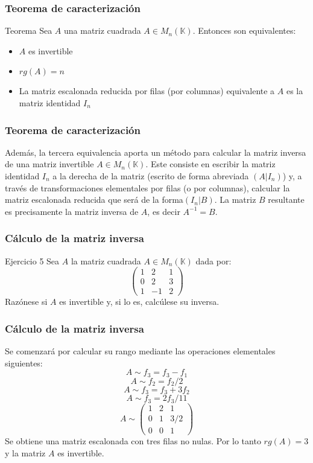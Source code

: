 \documentclass[aspectratio=169]{beamer}
\begin{document}
    
     \begin{frame}
  \frametitle{Teorema de caracterizaci\'on}
   \begin{block}{Teorema}
Sea $A$ una matriz cuadrada $A\in M_n(\mathbb{K})$. Entonces son equivalentes:
\begin{itemize}
\item $A$ es invertible
\item $rg(A) = n$
\item La matriz escalonada reducida por filas (por columnas) equivalente a $A$ es la matriz identidad $I_n$
\end{itemize}
\end{block}
  \end{frame} 
  
       \begin{frame}
  \frametitle{Teorema de caracterizaci\'on}
Adem\'as, la tercera equivalencia aporta un m\'etodo para calcular la matriz inversa de una matriz invertible $A \in M_n(\mathbb{K})$. Este consiste en escribir la matriz identidad $I_n$ a la derecha de la matriz (escrito de forma abreviada $(A | I_n)$) y, a trav\'es de transformaciones elementales por filas (o por columnas), calcular la matriz escalonada reducida que ser\'a de la forma$(I_n | B)$. La matriz $B$ resultante es precisamente la matriz inversa de $A$, es decir $A^{-1} = B$.
    \end{frame} 


     \begin{frame}
  \frametitle{C\'alculo de la matriz inversa}
   \begin{block}{Ejercicio 5}
Sea $A$ la matriz cuadrada $A\in M_n(\mathbb{K})$ dada por:
\[ \left(\begin{array}{ccc}1 & 2 & 1 \\0 & 2 & 3 \\1 & -1 & 2\end{array}\right)\]
Raz\'onese si $A$ es invertible y, si lo es, calc\'ulese su inversa.
\end{block}
  \end{frame} 
  
    \begin{frame}
  \frametitle{C\'alculo de la matriz inversa}
Se comenzar\'a por calcular su rango mediante las operaciones elementales siguientes:
\[A\sim f_3 = f_3-f_1\]
\[A\sim f_2 = f_2/2\]
\[A\sim f_3 = f_3+3f_2\]
\[A\sim f_3 = 2f_3/11\]
\[A\sim \left(\begin{array}{ccc}1 & 2 & 1 \\0 & 1 & 3/2 \\0 & 0 & 1\end{array}\right)\]
Se obtiene una matriz escalonada con tres filas no nulas. Por lo tanto $rg(A)=3$ y la matriz $A$ es invertible.
  \end{frame} 
\end{document}
